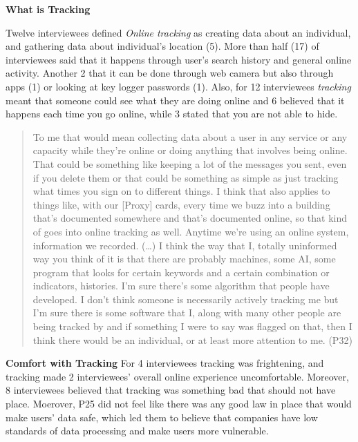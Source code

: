 \textbf{What is Tracking}

Twelve interviewees defined \textit{Online tracking} as creating data about an individual, and gathering data about individual's location (5). More than half (17) of interviewees said that it happens through user's search history and general online activity. Another 2 that it can be done through web camera but also through apps (1) or looking at key logger passwords (1). Also, for 12 interviewees  \textit{tracking} meant that someone could see what they are doing online and 6 believed that it happens each time you go online, while 3 stated that you are not able to hide.

\begin{quote}To me that would mean collecting data about a user in any service or any capacity while they're online or doing anything that involves being online. That could be something like keeping a lot of the messages you sent, even if you delete them or that could be something as simple as just tracking what times you sign on to different things. I think that also applies to things like, with our [Proxy] cards, every time we buzz into a building that's documented somewhere and that's documented online, so that kind of goes into online tracking as well. Anytime we're using an online system, information we recorded. (\dots) I think the way that I, totally uninformed way you think of it is that there are probably machines, some AI, some program that looks for certain keywords and a certain combination or indicators, histories. I'm sure there's some algorithm that people have developed. I don't think someone is necessarily actively tracking me but I'm sure there is some software that I, along with many other people are being tracked by and if something I were to say was flagged on that, then I think there would be an individual, or at least more attention to me. (P32)\end{quote}





\textbf{Comfort with Tracking}
For 4 interviewees tracking was frightening, and tracking made 2 interviewees' overall online experience uncomfortable. Moreover, 8 interviewees believed that tracking was something bad that should not have place. 
Moerover, P25 did not feel like there was any good law in place that would make users' data safe, which led them to believe that companies have low standards of data processing and make users more vulnerable. 

